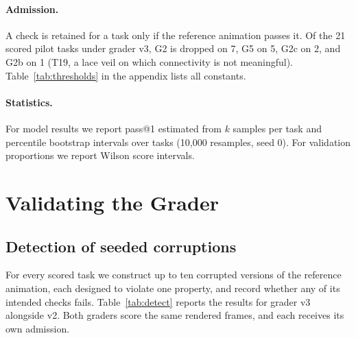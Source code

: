 \documentclass[11pt]{article}
\newcommand{\chk}[1]{\textsf{#1}}
\begin{document}
\paragraph{Admission.} A check is retained for a task only if the reference animation passes it. Of the 21 scored pilot tasks under grader v3, \chk{G2} is dropped on 7, \chk{G5} on 5, \chk{G2c} on 2, and \chk{G2b} on 1 (T19, a lace veil on which connectivity is not meaningful). Table~\ref{tab:thresholds} in the appendix lists all constants.

\paragraph{Statistics.} For model results we report pass@1 estimated from $k$ samples per task and percentile bootstrap intervals over tasks (10{,}000 resamples, seed 0). For validation proportions we report Wilson score intervals.

\section{Validating the Grader}
\label{sec:validate}

\subsection{Detection of seeded corruptions}
\label{sec:detect}

For every scored task we construct up to ten corrupted versions of the reference animation, each designed to violate one property, and record whether any of its intended checks fails. Table~\ref{tab:detect} reports the results for grader v3 alongside v2. Both graders score the same rendered frames, and each receives its own admission.
\end{document}
